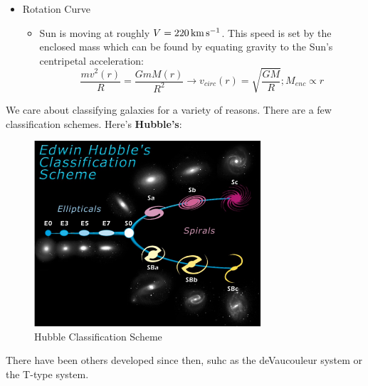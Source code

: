 \documentclass{article}
\newcommand{\unit}[1]{{\,\rm #1}}
\newcommand{\kms}{\unit{km}\unit{s}^{-1}}
\begin{document}
\begin{itemize}
\begin{itemize}
    \end{itemize}
    \item Rotation Curve
    \begin{itemize}
        \item Sun is moving at roughly $V = 220 \kms$. This speed is set by the enclosed mass which can be found by equating gravity to the Sun's centripetal acceleration:
        \begin{equation}
            \frac{m v^2\left(r\right)}{R} = \frac{GmM(r)}{R^2} \rightarrow \boxed{v_{circ}(r) = \sqrt{\frac{GM}{R}}}; \boxed{M_{enc} \propto r}
        \end{equation}
    \end{itemize}
\end{itemize}

We care about classifying galaxies for a variety of reasons. There are a few classification schemes. Here's \textbf{Hubble's}:

\begin{figure}[ht!]
    \centering
    \includegraphics[width=0.75\textwidth]{figs/Screen Shot 2021-08-27 at 1.35.32 PM.png}
    \caption{Hubble Classification Scheme}
    \label{fig:hub_scheme}
\end{figure}

There have been others developed since then, suhc as the deVaucouleur system or the T-type system. 
\end{document}
